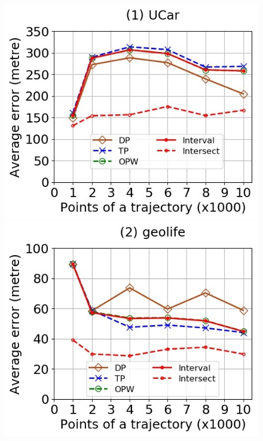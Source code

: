 \begin{figure}[tb!]
	\centering
	\includegraphics[scale=0.400]{Figures/Exp-where-DAD-error-size-service.jpg}	\hspace{2ex}
	\includegraphics[scale=0.400]{Figures/Exp-where-DAD-error-size-geolife.jpg}	\hspace{2ex}

\end{figure}
